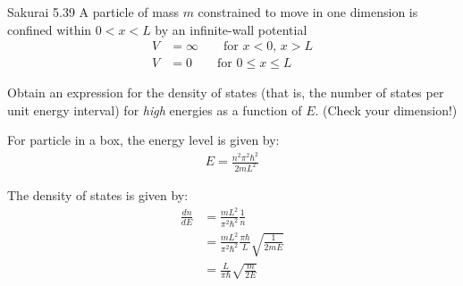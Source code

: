 \documentclass{article}
\begin{document}
\newpage
\begin{section}{Sakurai 5.39}
A particle of mass $m$ constrained to move in one dimension is confined within $0 < x < L$ by an infinite-wall potential
\begin{align*}
	V & = \infty \qquad \text{for $x < 0$, $x > L$} \\
	V & = 0 \qquad \text{for $0 \leq x \leq L$}
\end{align*}

Obtain an expression for the density of states (that is, the number of states per unit energy interval) for \textit{high} energies as a function of $E$. (Check your dimension!)

\begin{tcolorbox}[breakable]
	For particle in a box, the energy level is given by:
	\begin{align*}
		E = \frac{n^2 \pi^2 \hbar^2}{2mL^2}
	\end{align*}

	The density of states is given by:
	\begin{align*}
		\frac{dn}{dE} &= \frac{mL^2}{\pi^2 \hbar^2} \frac{1}{n} \\
		&= \frac{mL^2}{\pi^2 \hbar^2} \frac{\pi \hbar}{L} \sqrt{\frac{1}{2mE}} \\
		&= \frac{L}{\pi \hbar} \sqrt{\frac{m}{2E}}
	\end{align*}
\end{tcolorbox}
\end{section}
\end{document}
